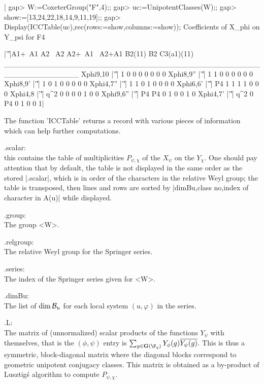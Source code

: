 |    gap> W:=CoxeterGroup("F",4);;
    gap> uc:=UnipotentClasses(W);;
    gap> show:=[13,24,22,18,14,9,11,19];;
    gap> Display(ICCTable(uc),rec(rows:=show,columns:=show));
    Coefficients of X_phi on Y_psi for F4

                |'\|'|A1+~A1 A2 ~A2 A2+~A1 ~A2+A1 B2(11) B2 C3(a1)(11)
    ______________________________________________________________
    Xphi{9,10}  |'\|'|     1  0   0      0      0      0  0          0
    Xphi{8,9}'' |'\|'|     1  1   0      0      0      0  0          0
    Xphi{8,9}'  |'\|'|     1  0   1      0      0      0  0          0
    Xphi{4,7}'' |'\|'|     1  1   0      1      0      0  0          0
    Xphi{6,6}'  |'\|'|    P4  1   1      1      1      0  0          0
    Xphi{4,8}   |'\|'|   q^2  0   0      0      0      1  0          0
    Xphi{9,6}'' |'\|'|    P4 P4   0      1      0      0  1          0
    Xphi{4,7}'  |'\|'|   q^2  0  P4      0      1      0  0          1|

The function 'ICCTable' returns a record with various pieces of information
which can help further computations.

.scalar:\\ this contains the table of multiplicities $P_{\psi,\chi}$ of the
$X_\psi$  on the  $Y_\chi$. One  should pay  attention that by default, the
table  is not displayed in the same order as the stored |.scalar|, which is
in  order  of  the  characters  in  the  relative  Weyl group; the table is
transposed,  then lines  and rows  are sorted  by |dimBu,class  no,index of
character in A(u)| while displayed.

.group:\\ The group <W>.

.relgroup:\\ The relative Weyl group for the Springer series.

.series:\\ The index of the Springer series given for <W>.

.dimBu:\\  The list of  $\dim{\mathcal B}_u$ for each  local system $(u,\varphi)$ in
the series.

.L:\\  The  matrix  of  (unnormalized)  scalar  products  of  the functions
$Y_\psi$   with   themselves,   that   is   the   $(\phi,\psi)$   entry  is
$\sum_{g\in\bG(\F_q)}  Y_\phi(g)  \overline{Y_\psi(g)}$.  This  is  thus  a
symmetric,  block-diagonal matrix  where the  diagonal blocks correspond to
geometric  unipotent  conjugacy  classes.  This  matrix  is  obtained  as a
by-product of Lusztig\'s algorithm to compute $P_{\psi,\chi}$.

